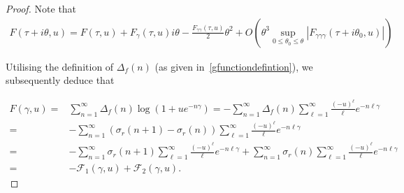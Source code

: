 \documentclass[12pt, oneside,reqno]{amsart}
\numberwithin{equation}{section}
\begin{document}
\begin{proof}
Note that
\begin{align}\label{saddlepointequationforsigmak}
F(\tau+i\theta,u)
=F(\tau,u)+F_{\gamma}(\tau, u)i\theta-\frac{F_{\gamma\gamma}(\tau,u)}{2}\theta^2+O\left(\theta^3\sup_{0\leq \theta_0\leq \theta}|F_{\gamma\gamma\gamma}(\tau+i\theta_0,u)|\right)
\end{align}

\noindent
Utilising the definition of $\Delta_f(n)$ (as given in~\eqref{gfunctiondefintion}), we subsequently deduce that

\begin{align}\label{curlyfgammau}
F(\gamma,u)
=&\sum_{n=1}^{\infty}\Delta_f(n)\log(1+ue^{-n\gamma})
=-\sum_{n=1}^{\infty}\Delta_f(n)\sum_{\ell=1}^{\infty}\frac{(-u)^{\ell}}{\ell}e^{-n\ell\gamma}\nonumber\\
=&-\sum_{n=1}^{\infty}(\sigma_r(n+1)-\sigma_r(n))\sum_{\ell=1}^{\infty}\frac{(-u)^{\ell}}{\ell}e^{-n\ell\gamma}\nonumber\\
=&-\sum_{n=1}^{\infty}\sigma_r(n+1)\sum_{\ell=1}^{\infty}\frac{(-u)^{\ell}}{\ell}e^{-n\ell\gamma}
+\sum_{n=1}^{\infty}\sigma_r(n)\sum_{\ell=1}^{\infty}\frac{(-u)^{\ell}}{\ell}e^{-n\ell\gamma}\nonumber\\
=&-\mathcal{F}_{1}(\gamma,u)+\mathcal{F}_{2}(\gamma,u).
\end{align}

\medskip


\end{proof}
\end{document}
